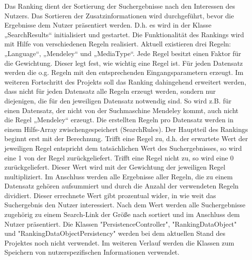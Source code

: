 Das Ranking dient der Sortierung der Suchergebnisse nach den Interessen des Nutzers. Das Sortieren der Zusatzinformationen wird durchgeführt, bevor die Ergebnisse dem Nutzer präsentiert werden. D.h. es wird in der Klasse „SearchResults“ initialisiert und gestartet. 
Die Funktionalität des Rankings wird mit Hilfe von verschiedenen Regeln realisiert. Aktuell existieren drei Regeln: „Language“, „Mendeley“ und „MediaType“. Jede Regel besitzt einen Faktor für die Gewichtung. Dieser legt fest, wie wichtig eine Regel ist. Für jeden Datensatz werden die o.g. Regeln mit den entsprechenden Eingangsparametern erzeugt. Im weiteren Fortschritt des Projekts soll das Ranking dahingehend erweitert werden, dass nicht für jeden Datensatz alle Regeln erzeugt werden, sondern nur diejenigen, die für den jeweiligen Datensatz notwendig sind. So wird z.B. für einen Datensatz, der nicht von der Suchmaschine Mendeley kommt, auch nicht die Regel „Mendeley“ erzeugt. 
Die erstellten Regeln pro Datensatz werden in einem Hilfs-Array zwischengespeichert (SearchRules). Der Hauptteil des Rankings beginnt erst mit der Berechnung. Trifft eine Regel zu, d.h. der erwartete Wert der jeweiligen Regel entspricht dem tatsächlichen Wert des Suchergebnisses, so wird eine 1 von der Regel zurückgeliefert. Trifft eine Regel nicht zu, so wird eine 0 zurückgeliefert. Dieser Wert wird mit der Gewichtung der jeweiligen Regel multipliziert. Im Anschluss werden alle Ergebnisse aller Regeln, die zu einem Datensatz gehören aufsummiert und durch die Anzahl der verwendeten Regeln dividiert. Dieser errechnete Wert gibt prozentual wider, in wie weit das Suchergebnis den Nutzer interessiert. Nach dem Wert werden alle Suchergebnisse zugehörig zu einem Search-Link der Größe nach sortiert und im Anschluss dem Nutzer präsentiert. 
Die Klassen "PersistenceController", "RankingDataObject" und "RankingDataObjectPersistency" werden bei dem aktuellen Stand des Projektes noch nicht verwendet. Im weiteren Verlauf werden die Klassen zum Speichern von nutzerspezifischen Informationen verwendet.


